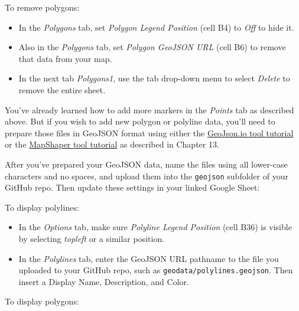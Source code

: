 \documentclass[
  english,
]{book}
\providecommand{\tightlist}{%
  \setlength{\itemsep}{0pt}\setlength{\parskip}{0pt}}
\begin{document}
To remove polygons:

\begin{itemize}
\tightlist
\item
  In the \emph{Polygons} tab, set \emph{Polygon Legend Position} (cell B4) to \emph{Off} to hide it.
\item
  Also in the \emph{Polygons} tab, set \emph{Polygon GeoJSON URL} (cell B6) to remove that data from your map.
\item
  In the next tab \emph{Polygons1}, use the tab drop-down menu to select \emph{Delete} to remove the entire sheet.
\end{itemize}

You've already learned how to add more markers in the \emph{Points} tab as described above. But if you wish to add new polygon or polyline data, you'll need to prepare those files in GeoJSON format using either the \href{geojsonio.html}{GeoJson.io tool tutorial} or the \href{mapshaper.html}{MapShaper tool tutorial} as described in Chapter 13.

After you've prepared your GeoJSON data, name the files using all lower-case characters and no spaces, and upload them into the \texttt{geojson} subfolder of your GitHub repo. Then update these settings in your linked Google Sheet:

To display polylines:

\begin{itemize}
\tightlist
\item
  In the \emph{Options} tab, make sure \emph{Polyline Legend Position} (cell B36) is visible by selecting \emph{topleft} or a similar position.
\item
  In the \emph{Polylines} tab, enter the GeoJSON URL pathname to the file you uploaded to your GitHub repo, such as \texttt{geodata/polylines.geojson}. Then insert a Display Name, Description, and Color.
\end{itemize}

To display polygons:
\end{document}
